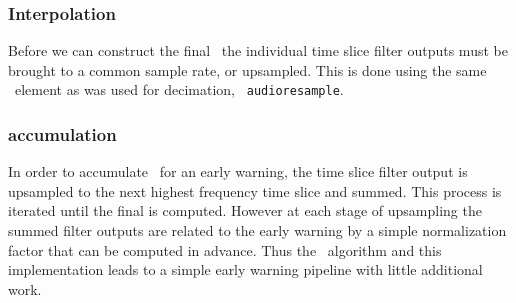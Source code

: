 \subsubsection{Interpolation}

Before we can construct the final \SNR\, the individual time slice filter
outputs must be brought to a common sample rate, or upsampled.  This is done
using the same \gstreamer\ element as was used for decimation, {\tt
audioresample}.  

\subsubsection{\SNR accumulation}

In order to accumulate \SNR\ for an early warning, the time slice filter
output is upsampled to the next highest frequency time slice and summed. This
process is iterated until the final \SNR is computed.  However at each stage
of upsampling the summed filter outputs are related to the early warning \SNR
by a simple normalization factor that can be computed in advance. Thus the
\lloid\ algorithm and this implementation leads to a simple early warning
pipeline with little additional work.


